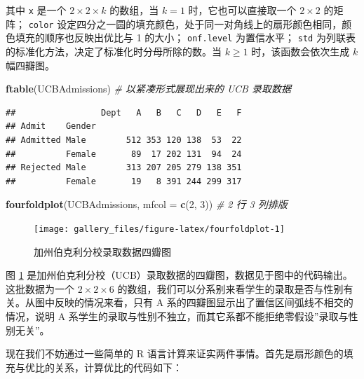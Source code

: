 \documentclass[
  b5paper,
  UTF8,twoside]{book}
\newenvironment{Shaded}{\begin{snugshade}}{\end{snugshade}}
\newcommand{\AttributeTok}[1]{\textcolor[rgb]{0.13,0.29,0.53}{#1}}
\newcommand{\CommentTok}[1]{\textcolor[rgb]{0.56,0.35,0.01}{\textit{#1}}}
\newcommand{\DecValTok}[1]{\textcolor[rgb]{0.00,0.00,0.81}{#1}}
\newcommand{\FunctionTok}[1]{\textcolor[rgb]{0.13,0.29,0.53}{\textbf{#1}}}
\newcommand{\NormalTok}[1]{#1}
\begin{document}
其中 \texttt{x} 是一个 \(2\times2\times k\) 的数组，当 \(k=1\) 时，它也可以直接取一个 \(2\times2\) 的矩阵； \texttt{color} 设定四分之一圆的填充颜色，处于同一对角线上的扇形颜色相同，颜色填充的顺序也反映出优比与 1 的大小； \texttt{onf.level} 为置信水平； \texttt{std} 为列联表的标准化方法，决定了标准化时分母所除的数。当 \(k\geq1\) 时，该函数会依次生成 \(k\) 幅四瓣图。





\begin{Shaded}
\begin{Highlighting}[]
\FunctionTok{ftable}\NormalTok{(UCBAdmissions) }\CommentTok{\# 以紧凑形式展现出来的 UCB 录取数据}
\end{Highlighting}
\end{Shaded}

\begin{verbatim}
##                 Dept   A   B   C   D   E   F
## Admit    Gender                             
## Admitted Male        512 353 120 138  53  22
##          Female       89  17 202 131  94  24
## Rejected Male        313 207 205 279 138 351
##          Female       19   8 391 244 299 317
\end{verbatim}

\begin{Shaded}
\begin{Highlighting}[]
\FunctionTok{fourfoldplot}\NormalTok{(UCBAdmissions, }\AttributeTok{mfcol =} \FunctionTok{c}\NormalTok{(}\DecValTok{2}\NormalTok{, }\DecValTok{3}\NormalTok{)) }\CommentTok{\# 2 行 3 列排版}
\end{Highlighting}
\end{Shaded}

\begin{figure}

{\centering \texttt{[image: gallery\_files/figure-latex/fourfoldplot-1]} 

}

\caption[加州伯克利分校录取数据四瓣图]{加州伯克利分校录取数据四瓣图}\label{fig:fourfoldplot}
\end{figure}

图 \ref{fig:fourfoldplot} 是加州伯克利分校（UCB）录取数据的四瓣图，数据见于图中的代码输出。这批数据为一个 \(2\times2\times6\) 的数组，我们可以分系别来看学生的录取是否与性别有关。从图中反映的情况来看，只有 A 系的四瓣图显示出了置信区间弧线不相交的情况，说明 A 系学生的录取与性别不独立，而其它系都不能拒绝零假设''录取与性别无关''。

现在我们不妨通过一些简单的 R 语言计算来证实两件事情。首先是扇形颜色的填充与优比的关系，计算优比的代码如下：
\end{document}
